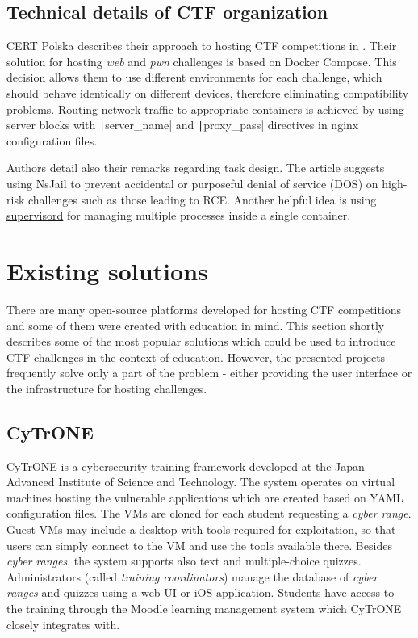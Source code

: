 \subsection{Technical details of CTF organization}

CERT Polska describes their approach to hosting CTF competitions in \cite{bib:hack.cert.pl}. Their solution for hosting \textit{web} and \textit{pwn} challenges is based on Docker Compose. This decision allows them to use different environments for each challenge, which should behave identically on different devices, therefore eliminating compatibility problems. Routing network traffic to appropriate containers is achieved by using server blocks with \texttt|server_name| and \texttt|proxy_pass| directives in nginx configuration files.

Authors detail also their remarks regarding task design. The article suggests using NsJail to prevent accidental or purposeful denial of service (DOS) on high-risk challenges such as those leading to RCE. Another helpful idea is using \href{https://github.com/Supervisor/supervisor}{supervisord} for managing multiple processes inside a single container.

\section{Existing solutions}
\label{sec:existing-solutions}

There are many open-source platforms developed for hosting CTF competitions and some of them were created with education in mind. This section shortly describes some of the most popular solutions which could be used to introduce CTF challenges in the context of education. However, the presented projects frequently solve only a part of the problem - either providing the user interface or the infrastructure for hosting challenges.

\subsection{CyTrONE}

\href{https://github.com/crond-jaist/cytrone}{CyTrONE} \cite{bib:cytrone} is a cybersecurity training framework developed at the Japan Advanced Institute of Science and Technology. The system operates on virtual machines hosting the vulnerable applications which are created based on YAML configuration files. The VMs are cloned for each student requesting a \textit{cyber range}. Guest VMs may include a desktop with tools required for exploitation, so that users can simply connect to the VM and use the tools available there. Besides \textit{cyber ranges}, the system supports also text and multiple-choice quizzes. Administrators (called \textit{training coordinators}) manage the database of \textit{cyber ranges} and quizzes using a web UI or iOS application. Students have access to the training through the Moodle learning management system which CyTrONE closely integrates with.

